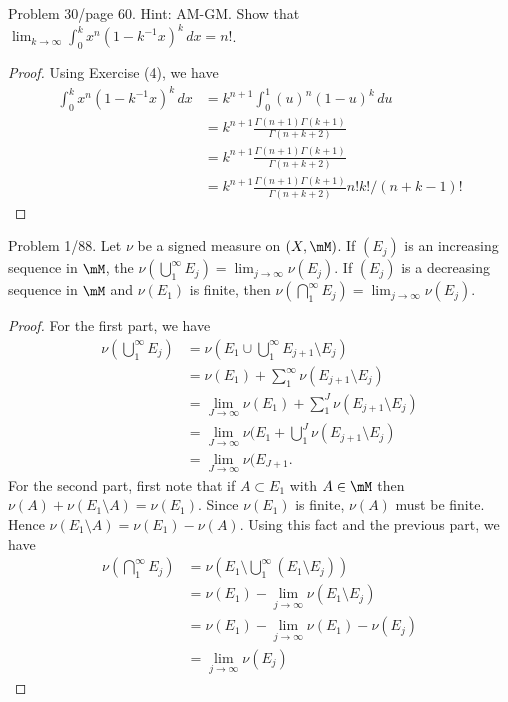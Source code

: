 \documentclass{article}
\begin{document}
 Problem 30/page 60. Hint: AM-GM. Show that $\lim_{k \to \infty} \int_0^k x^n (1 - k^{-1} x) ^k \, dx = n!$.
\begin{proof}
Using Exercise (4), we have
\begin{align*}
\int_0^k x^n (1 - k^{-1} x) ^k \, dx & =  k^{n+1} \int_0^1 (u)^n (1 - u)^k   \, du
\\ & =  k^{n+1} \frac{\Gamma(n+1) \Gamma(k+1)}{\Gamma(n + k + 2)}
\\ & =  k^{n+1} \frac{\Gamma(n+1) \Gamma(k+1)}{\Gamma(n + k + 2)}
\\ & = k^{n+1} \frac{\Gamma(n+1) \Gamma(k+1)}{\Gamma(n + k + 2)} %

n! k! /(n+k -1)!
\end{align*}
\end{proof}

 Problem 1/88. Let $\nu$ be a signed measure on $(X, \mM)$. If $(E_j)$ is an increasing sequence in $\mM$, the $\nu(\bigcup_1^\infty E_j) = \lim_{j \to \infty} \nu(E_j)$. If $(E_j)$ is a decreasing sequence in $\mM$ and $\nu(E_1)$ is finite, then $\nu(\bigcap_1^\infty E_j) = \lim_{j \to \infty} \nu(E_j)$.
\begin{proof}
For the first part, we have
\begin{align*}
\nu(\bigcup_1^\infty E_j) & = \nu(E_1 \cup \bigcup_1^\infty E_{j+1} \setminus E_j)  
\\ & = \nu(E_1) + \sum_1^\infty \nu(E_{j+1} \setminus E_j)
\\ & = \lim_{J \to \infty} \nu(E_1) + \sum_1^J \nu(E_{j+1} \setminus E_j)
\\ & = \lim_{J \to \infty} \nu(E_1 + \bigcup_1^J \nu(E_{j+1} \setminus E_j)
\\ & = \lim_{J \to \infty} \nu(E_{J+1}.
\end{align*}
For the second part, first note that if $A \subset E_1$ with $A \in \mM$ then $\nu(A) + \nu(E_1 \setminus A) = \nu(E_1)$. Since $\nu(E_1)$ is finite, $\nu(A)$ must be finite. Hence $\nu(E_1 \setminus A) = \nu(E_1) - \nu(A)$.  Using this fact and the previous part, we have
\begin{align*}
\nu(\bigcap_1^\infty E_j) & = \nu(E_1 \setminus \bigcup_1^\infty (E_1 \setminus E_j))
\\ & = \nu(E_1) - \lim_{j \to \infty} \nu(E_1 \setminus E_j)
\\ & = \nu(E_1) - \lim_{j \to \infty} \nu(E_1) - \nu(E_j)
\\ & = \lim_{j \to \infty} \nu(E_j)
\end{align*}
\end{proof}
\end{document}
